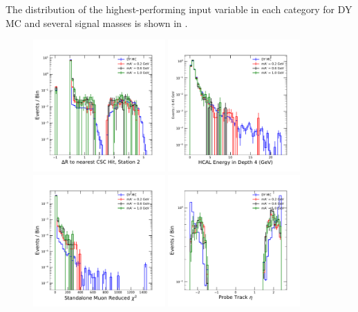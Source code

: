 The distribution of the highest-performing input variable in each category for DY MC and several signal masses is shown in .

\begin{figure}[htpb]
	\label{fig:bdtFeatures}
	\centering
	\includegraphics[width=0.45\textwidth]{figures/bdtInputFeatscscDRbyStation_1.pdf}
	\hspace{0.01\textwidth}
	\includegraphics[width=0.45\textwidth]{figures/bdtInputFeatsHEDepth_4.pdf}
	\includegraphics[width=0.45\textwidth]{figures/bdtInputFeatsstaChi.pdf}
	\hspace{0.01\textwidth}
	\includegraphics[width=0.45\textwidth]{figures/bdtInputFeatseta.pdf}

\end{figure}
